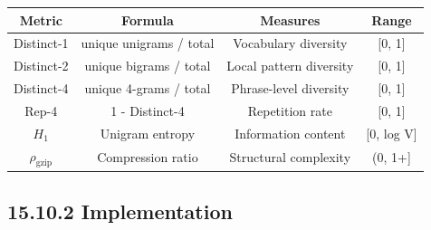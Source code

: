 \begin{center}
\begin{tabular}{cccc}
\toprule
Metric & Formula & Measures & Range \\
\midrule
Distinct-1 & unique unigrams / total & Vocabulary diversity & [0, 1] \\
Distinct-2 & unique bigrams / total & Local pattern diversity & [0, 1] \\
Distinct-4 & unique 4-grams / total & Phrase-level diversity & [0, 1] \\
Rep-4 & 1 - Distinct-4 & Repetition rate & [0, 1] \\
$H_1$ & Unigram entropy & Information content & [0, log V] \\
$\rho_{\text{gzip}}$ & Compression ratio & Structural complexity & (0, 1+] \\
\bottomrule
\end{tabular}
\end{center}

\subsection{15.10.2 Implementation}

